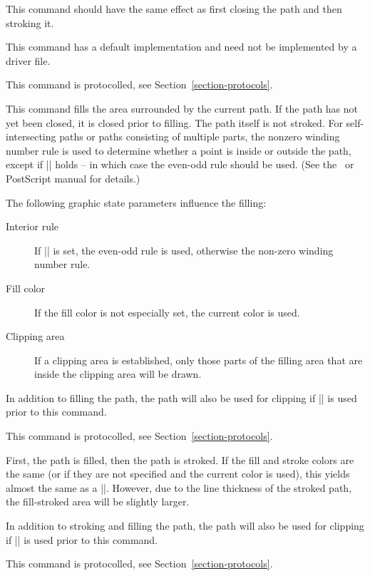\begin{command}{\pgfsys@closestroke}
  This command should have the same effect as first closing the path
  and then stroking it.

  This command has a default implementation and need not be
  implemented by a driver file.

  This command is protocolled, see Section~\ref{section-protocols}.
\end{command}


\begin{command}{\pgfsys@fill}
  This command fills the area surrounded by the current path. If the
  path has not yet been closed, it is closed prior to filling. The
  path itself is not stroked. For self-intersecting paths or paths
  consisting of multiple parts, the nonzero winding number rule is
  used to determine whether a point is inside or outside the
  path, except if |\ifpgfsys@eorule| holds -- in which case the
  even-odd rule should be used. (See the \pdf\ or PostScript manual
  for details.)

  The following graphic state parameters influence the filling:

  \begin{description}
  \item[Interior rule]
    If |\ifpgfsys@eorule| is set, the even-odd rule is used, otherwise
    the non-zero winding number rule.

  \item[Fill color]
    If the fill color is not especially set, the current color is
    used.

  \item[Clipping area]
    If a clipping area is established, only those parts of the filling
    area that are inside the clipping area will be drawn.
  \end{description}

  In addition to filling the path, the path will also be used for
  clipping if |\pgfsys@clipnext| is used prior to this command.

  This command is protocolled, see Section~\ref{section-protocols}.
\end{command}

\begin{command}{\pgfsys@fillstroke}
  First, the path is filled, then the path is stroked. If the fill and
  stroke colors are the same (or if they are not specified and the
  current color is used), this yields almost the same as a
  |\pgfsys@fill|. However, due to the line thickness of the stroked
  path, the fill-stroked area will be slightly larger.

  In addition to stroking and filling the path, the path will also be
  used for clipping if |\pgfsys@clipnext| is used prior to this command.

  This command is protocolled, see Section~\ref{section-protocols}.
\end{command}


